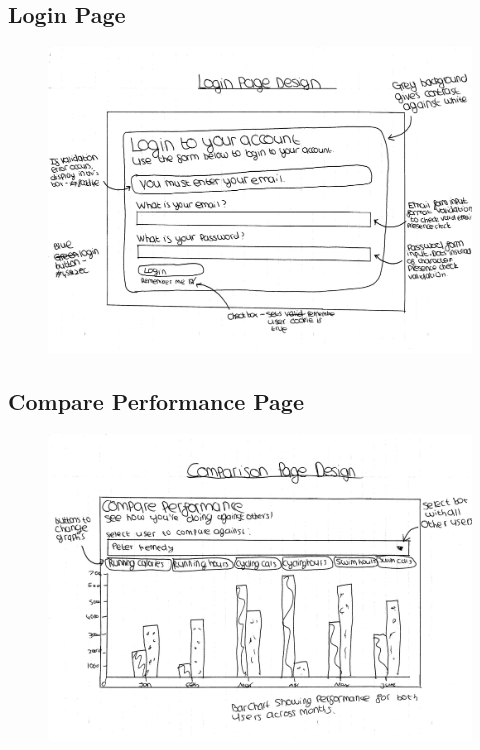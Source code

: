 \documentclass{article}[12pt,a4paper]
\begin{document}
\subsection{Login Page}
\begin{figure}[h!]
  \includegraphics[scale=0.55]{design_ui/login}
\end{figure}
\clearpage

\subsection{Compare Performance Page}
\begin{figure}[h!]
  \includegraphics[scale=0.55]{design_ui/compare_performance}
\end{figure}
\clearpage
\end{document}
